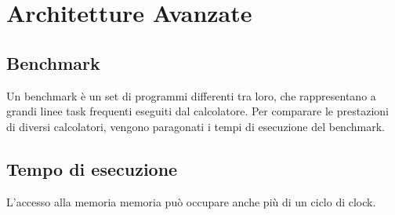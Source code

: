 \documentclass[../template]{subfiles}
\begin{document}
\section{Architetture Avanzate}
\subsection{Benchmark}
Un benchmark è un set di programmi differenti tra loro, che rappresentano
a grandi linee task frequenti eseguiti dal calcolatore.
Per comparare le prestazioni di diversi calcolatori, vengono paragonati
i tempi di esecuzione del benchmark.

\subsection{Tempo di esecuzione}
L'accesso alla memoria memoria può occupare anche più di un ciclo di clock.
\end{document}
